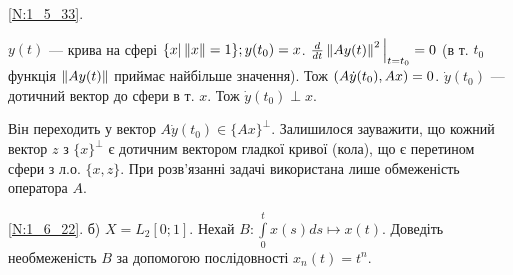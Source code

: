 \noindent\ref{N:1_5_33}.
\begin{minipage}{0.25\textwidth}
\end{minipage}
\begin{minipage}{0.7\textwidth}
    $y(t)$ --- крива на сфері $\{x | \left\lVert x\right\rVert = 1\}; y(t_0) = x$. $\frac{d}{dt} \left\lVert A y(t)\right\rVert^2 \Big|_{t = t_0} = 0$
    (в т. $t_0$ функція $\left\lVert A y(t)\right\rVert$ приймає найбільше значення). Тож $\left(A \dot{y} (t_0), A x\right) = 0$.
    $\dot{y} (t_0)$ --- дотичний вектор до сфери в т. $x$. Тож $\dot{y} (t_0) \perp x$. 
\end{minipage}
Він переходить у вектор $A \dot{y} (t_0) \in \{Ax\}^{\perp}$. Залишилося зауважити, що кожний вектор $z$ з $\{x\}^{\perp}$ є дотичним вектором
гладкої кривої (кола), що є перетином сфери з л.о. $\{x, z\}$. При розв'язанні задачі використана лише обмеженість оператора $A$.

\noindent\ref{N:1_6_22}. б) $X = L_2 [0; 1]$. Нехай $B: \int\limits_0^t x(s) ds \mapsto x(t)$. Доведіть необмеженість
$B$ за допомогою послідовності $x_n(t) = t^n$.
